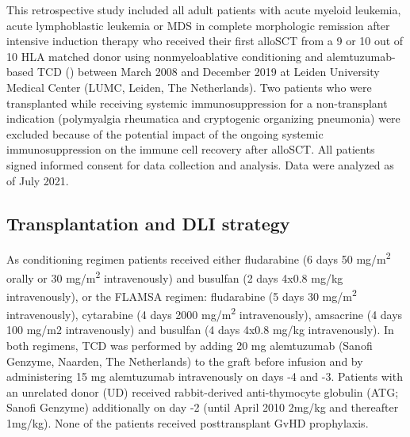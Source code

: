 \documentclass[
  letterpaper,
  DIV=11,
  numbers=noendperiod]{scrreprt}
\begin{document}
This retrospective study included all adult patients with acute myeloid
leukemia, acute lymphoblastic leukemia or MDS in complete morphologic
remission after intensive induction therapy who received their first
alloSCT from a 9 or 10 out of 10 HLA matched donor using
nonmyeloablative conditioning and alemtuzumab-based TCD
() between March 2008 and December 2019 at
Leiden University Medical Center (LUMC, Leiden, The Netherlands). Two
patients who were transplanted while receiving systemic
immunosuppression for a non-transplant indication (polymyalgia
rheumatica and cryptogenic organizing pneumonia) were excluded because
of the potential impact of the ongoing systemic immunosuppression on the
immune cell recovery after alloSCT. All patients signed informed consent
for data collection and analysis. Data were analyzed as of July 2021.

\subsection{Transplantation and DLI
strategy}\label{transplantation-and-dli-strategy}

As conditioning regimen patients received either fludarabine (6 days 50
mg/m\textsuperscript{2} orally or 30 mg/m\textsuperscript{2}
intravenously) and busulfan (2 days 4x0.8 mg/kg intravenously), or the
FLAMSA regimen: fludarabine (5 days 30 mg/m\textsuperscript{2}
intravenously), cytarabine (4 days 2000 mg/m\textsuperscript{2}
intravenously), amsacrine (4 days 100 mg/m2 intravenously) and busulfan
(4 days 4x0.8 mg/kg intravenously). In both regimens, TCD was performed
by adding 20 mg alemtuzumab (Sanofi Genzyme, Naarden, The Netherlands)
to the graft before infusion and by administering 15 mg alemtuzumab
intravenously on days -4 and -3. Patients with an unrelated donor (UD)
received rabbit-derived anti-thymocyte globulin (ATG; Sanofi Genzyme)
additionally on day -2 (until April 2010 2mg/kg and thereafter 1mg/kg).
None of the patients received posttransplant GvHD prophylaxis.
\end{document}
